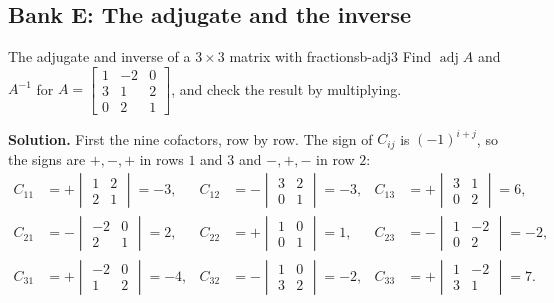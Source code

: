 \documentclass[11pt]{article}
\begin{document}
\subsection*{Bank E: The adjugate and the inverse}

\begin{exmp}{The adjugate and inverse of a $3\times3$ matrix with fractions}{b-adj3}
Find $\operatorname{adj}A$ and $A^{-1}$ for $A=\begin{bmatrix}1&-2&0\\3&1&2\\0&2&1\end{bmatrix}$, and check the result by multiplying.

\textbf{Solution.} First the nine cofactors, row by row. The sign of $C_{ij}$ is $(-1)^{i+j}$, so the signs are $+,-,+$ in rows $1$ and $3$ and $-,+,-$ in row $2$:
\begin{align*}
C_{11}&=+\begin{vmatrix}1&2\\2&1\end{vmatrix}=-3, & C_{12}&=-\begin{vmatrix}3&2\\0&1\end{vmatrix}=-3, & C_{13}&=+\begin{vmatrix}3&1\\0&2\end{vmatrix}=6,\\
C_{21}&=-\begin{vmatrix}-2&0\\2&1\end{vmatrix}=2, & C_{22}&=+\begin{vmatrix}1&0\\0&1\end{vmatrix}=1, & C_{23}&=-\begin{vmatrix}1&-2\\0&2\end{vmatrix}=-2,\\
C_{31}&=+\begin{vmatrix}-2&0\\1&2\end{vmatrix}=-4, & C_{32}&=-\begin{vmatrix}1&0\\3&2\end{vmatrix}=-2, & C_{33}&=+\begin{vmatrix}1&-2\\3&1\end{vmatrix}=7.

\end{align*}
\end{exmp}
\end{document}

